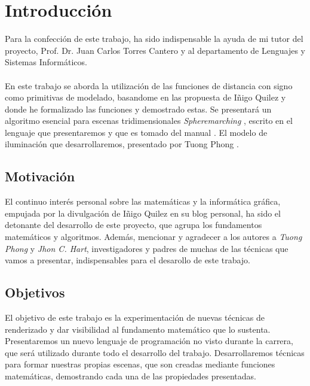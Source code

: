 \chapter*{Introducción}
Para la confección de este trabajo, ha sido indispensable la ayuda de mi tutor del proyecto, Prof. Dr. Juan Carlos Torres Cantero y al departamento de Lenguajes y Sistemas Informáticos.\\\\
En este trabajo se aborda la utilización de las funciones de distancia con signo como primitivas de modelado, basandome en las propuesta de Iñigo Quilez \cite{2ddistinigo} y \cite{3ddistinigo} donde he formalizado las funciones y demostrado estas. Se presentará un algoritmo esencial para escenas tridimensionales \textit{Spheremarching} \cite{hart1996sphere}, escrito en el lenguaje que presentaremos y que es tomado del manual \cite{glsl}. El modelo de iluminación que desarrollaremos, presentado por Tuong Phong \cite{phong1975illumination}.

\section*{Motivación}
El continuo interés personal sobre las matemáticas y la informática gráfica, empujada por la divulgación de Iñigo Quilez en su blog personal, ha sido el detonante del desarrollo de este proyecto, que agrupa los fundamentos matemáticos y algoritmos. Además, mencionar y agradecer a los autores a \textit{Tuong Phong} y \textit{Jhon C. Hart}, investigadores y padres de muchas de las técnicas que vamos a presentar, indispensables para el desarollo de este trabajo.

\section*{Objetivos}
El objetivo de este trabajo es la experimentación de nuevas técnicas de renderizado y  dar visibilidad al fundamento matemático que lo sustenta. Presentaremos un nuevo lenguaje de programación no visto durante la carrera, que será utilizado durante todo el desarrollo del trabajo. Desarrollaremos técnicas para formar nuestras propias escenas, que son creadas mediante funciones matemáticas, demostrando cada una de las propiedades presentadas.

